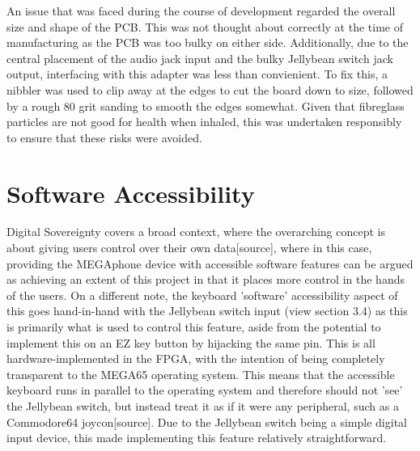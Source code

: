 An issue that was faced during the course of development regarded the overall size and shape of the PCB.
This was not thought about correctly at the time of manufacturing as the PCB was too bulky on either side.
Additionally, due to the central placement of the audio jack input and the bulky Jellybean switch jack output, interfacing with this adapter was less than convienient.
To fix this, a nibbler was used to clip away at the edges to cut the board down to size, followed by a rough 80 grit sanding to smooth the edges somewhat.
Given that fibreglass particles are not good for health when inhaled, this was undertaken responsibly to ensure that these risks were avoided.


\section{Software Accessibility}
Digital Sovereignty covers a broad context, where the overarching concept is about giving users control over their own data[source], where in this case, providing the MEGAphone device with accessible software features can be argued as achieving an extent of this project in that it places more control in the hands of the users.
On a different note, the keyboard 'software' accessibility aspect of this goes hand-in-hand with the Jellybean switch input (view section 3.4) as this is primarily what is used to control this feature, aside from the potential to implement this on an EZ key button by hijacking the same pin.
This is all hardware-implemented in the FPGA, with the intention of being completely transparent to the MEGA65 operating system.
This means that the accessible keyboard runs in parallel to the operating system and therefore should not 'see' the Jellybean switch, but instead treat it as if it were any peripheral, such as a Commodore64 joycon[source].
Due to the Jellybean switch being a simple digital input device, this made implementing this feature relatively straightforward.


